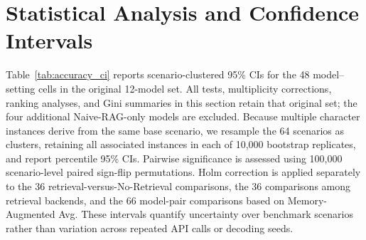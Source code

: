 \documentclass[11pt]{article}
\begin{document}
\section{Statistical Analysis and Confidence Intervals}
\label{app:statistical_analysis}

Table~\ref{tab:accuracy_ci} reports scenario-clustered 95\% CIs for the 48 model--setting cells in the original 12-model set. All tests, multiplicity corrections, ranking analyses, and Gini summaries in this section retain that original set; the four additional Naive-RAG-only models are excluded. Because multiple character instances derive from the same base scenario, we resample the 64 scenarios as clusters, retaining all associated instances in each of 10{,}000 bootstrap replicates, and report percentile 95\% CIs. Pairwise significance is assessed using 100{,}000 scenario-level paired sign-flip permutations. Holm correction is applied separately to the 36 retrieval-versus-No-Retrieval comparisons, the 36 comparisons among retrieval backends, and the 66 model-pair comparisons based on Memory-Augmented Avg. These intervals quantify uncertainty over benchmark scenarios rather than variation across repeated API calls or decoding seeds.
\end{document}
